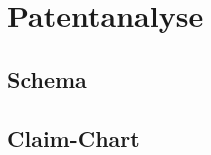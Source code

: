 \section{Patentanalyse}\label{sec:Patentanalyse}
\subsection{Schema}\label{subsec:Schema}
\subsection{Claim-Chart}\label{sec:Claim-Chart}